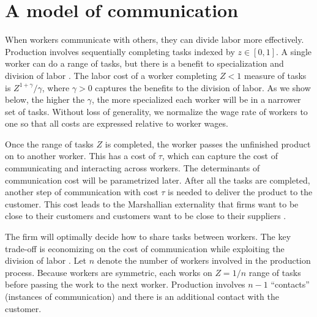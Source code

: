 \documentclass[10pt,letterpaper]{article}
\begin{document}
\section*{A model of communication}
When workers communicate with others, they can divide labor more effectively. Production involves sequentially completing tasks indexed by $z\in[0,1]$. A single worker can do a range of tasks, but there is a benefit to specialization and division of labor \cite{Smith1778-qq,Becker1992-ac}. The labor cost of a worker completing $Z<1$ measure of tasks is $Z^{1+\gamma}/\gamma$, where $\gamma>0$ captures the benefits to the division of labor. As we show below, the higher the $\gamma$, the more specialized each worker will be in a narrower set of tasks. Without loss of generality, we normalize the wage rate of workers to one so that all costs are expressed relative to worker wages.

Once the range of tasks $Z$ is completed, the worker passes the unfinished product on to another worker. This has a cost of $\tau$, which can capture the cost of communicating and interacting across workers. The determinants of communication cost will be parametrized later. After all the tasks are completed, another step of communication with cost $\tau$ is needed to deliver the product to the customer. This cost leads to the Marshallian externality that firms want to be close to their customers and customers want to be close to their suppliers \cite{Marshall1920-ps,Krugman1991-gr}.

The firm will optimally decide how to share tasks between workers. The key trade-off is economizing on the cost of communication while exploiting the division of labor \cite{Becker1992-ac}. Let $n$ denote the number of workers involved in the production process. Because workers are symmetric, each works on $Z=1/n$ range of tasks before passing the work to the next worker. Production involves $n-1$ ``contacts'' (instances of communication) and there is an additional contact with the customer. 
\end{document}
